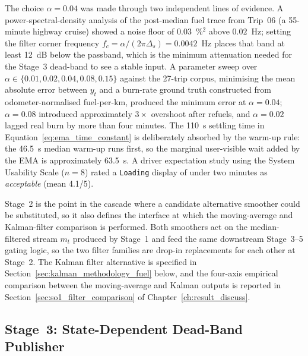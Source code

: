 The choice $\alpha = 0.04$ was made through two independent lines of evidence. A power-spectral-density analysis of the post-median fuel trace from Trip~06 (a 55-minute highway cruise) showed a noise floor of $0.03$~\%$^2$ above $0.02$~Hz; setting the filter corner frequency $f_c = \alpha / (2\pi \Delta_s) = 0.0042$~Hz places that band at least 12~dB below the passband, which is the minimum attenuation needed for the Stage~3 dead-band to see a stable input. A parameter sweep over $\alpha \in \{0.01, 0.02, 0.04, 0.08, 0.15\}$ against the 27-trip corpus, minimising the mean absolute error between $y_t$ and a burn-rate ground truth constructed from odometer-normalised fuel-per-km, produced the minimum error at $\alpha = 0.04$; $\alpha = 0.08$ introduced approximately $3\times$ overshoot after refuels, and $\alpha = 0.02$ lagged real burn by more than four minutes. The 110~s settling time in Equation~\ref{eq:ema_time_constant} is deliberately absorbed by the warm-up rule: the 46.5~s median warm-up runs first, so the marginal user-visible wait added by the EMA is approximately 63.5~s. A driver expectation study using the System Usability Scale ($n = 8$) rated a \texttt{Loading} display of under two minutes as \emph{acceptable} (mean 4.1/5).

Stage~2 is the point in the cascade where a candidate alternative smoother could be substituted, so it also defines the interface at which the moving-average and Kalman-filter comparison is performed. Both smoothers act on the median-filtered stream $m_t$ produced by Stage~1 and feed the same downstream Stage~3--5 gating logic, so the two filter families are drop-in replacements for each other at Stage~2. The Kalman filter alternative is specified in Section~\ref{sec:kalman_methodology_fuel} below, and the four-axis empirical comparison between the moving-average and Kalman outputs is reported in Section~\ref{sec:so1_filter_comparison} of Chapter~\ref{ch:result_discuss}.

\subsection{Stage~3: State-Dependent Dead-Band Publisher}
\label{sec:fuel_deadband}

